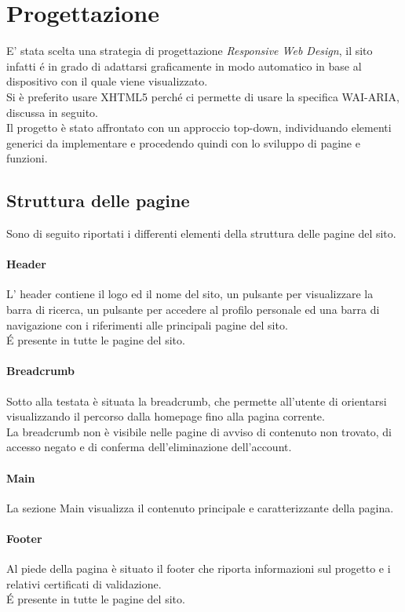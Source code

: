 \section{Progettazione}
E' stata scelta una strategia di progettazione \textit{Responsive Web Design}, il sito infatti é in grado di adattarsi graficamente in modo automatico in base al dispositivo con il quale viene visualizzato. \\
Si è preferito usare  XHTML5  perché  ci  permette  di  usare  la  specifica  WAI-ARIA, discussa in seguito.\\
Il progetto è stato affrontato con un approccio top-down, individuando elementi generici da implementare e procedendo quindi con lo sviluppo di pagine e funzioni.

\subsection{Struttura delle pagine}
Sono di seguito riportati i differenti elementi della struttura delle pagine del sito.
\paragraph{Header}
L' header contiene il logo ed il nome del sito, un pulsante per visualizzare la barra di ricerca, un pulsante per accedere al profilo personale ed una barra di navigazione con i riferimenti alle principali pagine del sito.\\
\'E presente in tutte le pagine del sito.
\paragraph{Breadcrumb}
Sotto alla testata è situata la breadcrumb, che permette all'utente di orientarsi visualizzando il percorso dalla homepage fino alla pagina corrente.\\
La breadcrumb non è visibile nelle pagine di avviso di contenuto non trovato, di accesso negato e di conferma dell'eliminazione dell'account.
\paragraph{Main}
La sezione Main visualizza il contenuto principale e caratterizzante della pagina.
\paragraph{Footer}
Al piede della pagina è situato il footer che riporta informazioni sul progetto e i relativi certificati di validazione.\\
\'E presente in tutte le pagine del sito.

